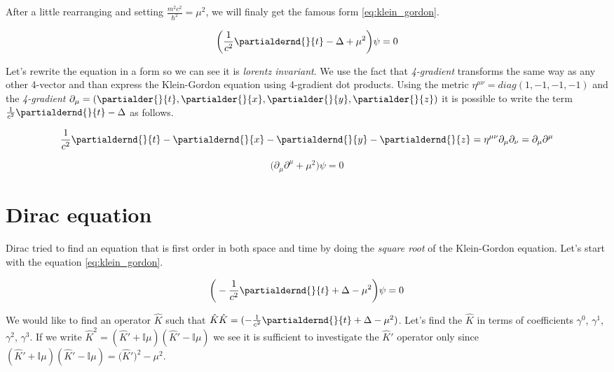 After a little rearranging and setting $\frac{m^{2} c^{2}}{\hbar^{2}} = \mu^{2}$, we will finaly get the famous form \ref{eq:klein_gordon}.

\begin{equation}
    \label{eq:klein_gordon}
    \bigg(\frac{1}{c^{2}} \partialdernd{}{t} - \Delta + \mu^{2} \bigg) \psi = 0
\end{equation}

Let's rewrite the equation in a form so we can see it is \textit{lorentz invariant}. We use the fact that \textit{4-gradient}
transforms the same way as any other 4-vector and than express the Klein-Gordon equation using 4-gradient dot products.
Using the metric $\eta^{\mu \nu} = diag(1, -1, -1, -1)$ and the \textit{4-gradient} $\partial_{\mu} = (\partialder{}{t}, \partialder{}{x}, \partialder{}{y}, \partialder{}{z})$ 
it is possible to write the term $\frac{1}{c^{2}} \partialdernd{}{t} - \Delta$ as follows.

\begin{equation*}
     \frac{1}{c^{2}} \partialdernd{}{t} - \partialdernd{}{x} - \partialdernd{}{y} - \partialdernd{}{z} = \eta^{\mu \nu} \partial_{\mu} \partial_{\nu} = \partial_{\mu} \partial^{\mu}
\end{equation*}

\begin{equation}
    \bigg(\partial_{\mu} \partial^{\mu} + \mu^{2} \bigg) \psi = 0
\end{equation}

\section{Dirac equation}

\paragraph{} Dirac tried to find an equation that is first order in both space and time by doing the \textit{square root} 
of the Klein-Gordon equation. Let's start with the equation \ref{eq:klein_gordon}.

\begin{equation*}
    \bigg(- \frac{1}{c^{2}} \partialdernd{}{t} + \Delta - \mu^{2} \bigg) \psi = 0
\end{equation*}

We would like to find an operator $\hat{K}$ such that $\hat{K} \hat{K} = (-\frac{1}{c^{2}} \partialdernd{}{t} + \Delta - \mu^{2})$. Let's
find the $\hat{K}$ in terms of coefficients $\gamma^{0}$, $\gamma^{1}$, $\gamma^{2}$, $\gamma^{3}$. If we write $\hat{K}^{2} = (\hat{K}' + \mathbb{I} \mu)(\hat{K}' - \mathbb{I} \mu)$
we see it is sufficient to investigate the $\hat{K}'$ operator only since $(\hat{K}' + \mathbb{I} \mu)(\hat{K}' - \mathbb{I} \mu) = \big(\hat{K}'\big)^{2} - \mu^{2}$.

